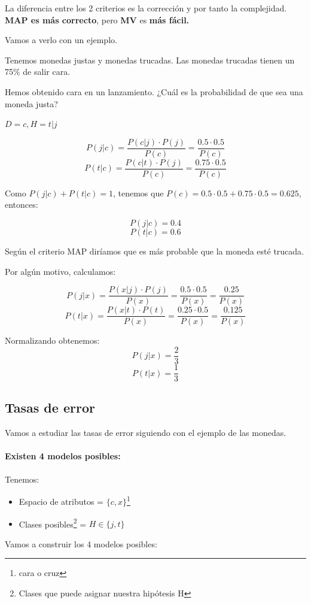 \documentclass{apuntes}
\begin{document}
La diferencia entre los 2 criterios es la corrección y por tanto la complejidad. \textbf{MAP es más correcto}, pero \textbf{MV} es \textbf{más fácil.} 

Vamos a verlo con un ejemplo.

\begin{example}
Tenemos monedas justas y monedas trucadas. Las monedas trucadas tienen un 75\% de salir cara.

Hemos obtenido cara en un lanzamiento. ¿Cuál es la probabilidad de que sea una moneda justa?

$D=c, H=t|j$

\[
P(j|c) = \frac{P(c|j)·P(j)}{P(c)} = \frac{0.5·0.5}{P(c)}
\]
\[
P(t|c) = \frac{P(c|t)·P(j)}{P(c)} = \frac{0.75·0.5}{P(c)}
\]

Como $P(j|c) + P(t|c) = 1$, tenemos que $P(c) = 0.5·0.5 + 0.75·0.5 = 0.625$, entonces:

\label{calculadoAnteriomente1}
\[P(j|c) = 0.4\]
\[P(t|c) = 0.6\]

Según el criterio MAP diríamos que es más probable que la moneda esté trucada. 

Por algún motivo, calculamos:

\[P(j|x) = \frac{P(x|j)·P(j)}{P(x)} = \frac{0.5·0.5}{P(x)} = \frac{0.25}{P(x)}\]
\[P(t|x) = \frac{P(x|t)·P(t)}{P(x)} = \frac{0.25·0.5}{P(x)} = \frac{0.125}{P(x)}\]

Normalizando obtenemos:
\label{calculadoAnteriomente2}
\[P(j|x) = \frac{2}{3}\]
\[P(t|x) = \frac{1}{3}\]

\subsection{Tasas de error}

Vamos a estudiar las tasas de error siguiendo con el ejemplo de las monedas.

\paragraph{Existen 4 modelos posibles:}
Tenemos:
\begin{itemize}
\item Espacio de atributos = $\{c,x\}$\footnote{cara o cruz}
\item Clases posibles\footnote{Clases que puede asignar nuestra hipótesis H} = $H\in\{j,t\}$
\end{itemize}

Vamos a construir los 4 modelos posibles:


\end{example}
\end{document}
